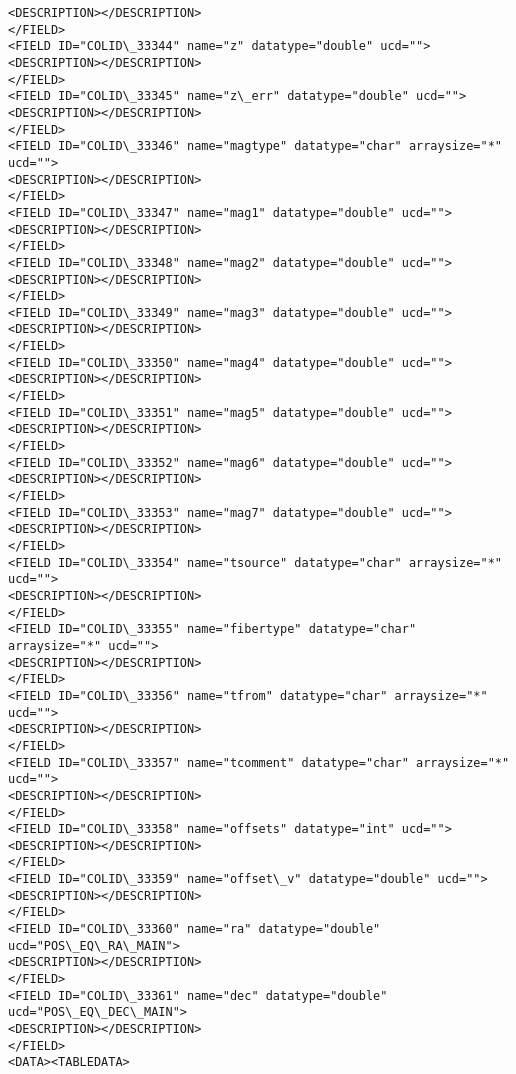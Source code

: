 \documentclass[11pt]{article}
\begin{document}
\begin{Verbatim}[commandchars=\\\{\}]
<DESCRIPTION></DESCRIPTION>
</FIELD>
<FIELD ID="COLID\_33344" name="z" datatype="double" ucd="">
<DESCRIPTION></DESCRIPTION>
</FIELD>
<FIELD ID="COLID\_33345" name="z\_err" datatype="double" ucd="">
<DESCRIPTION></DESCRIPTION>
</FIELD>
<FIELD ID="COLID\_33346" name="magtype" datatype="char" arraysize="*" ucd="">
<DESCRIPTION></DESCRIPTION>
</FIELD>
<FIELD ID="COLID\_33347" name="mag1" datatype="double" ucd="">
<DESCRIPTION></DESCRIPTION>
</FIELD>
<FIELD ID="COLID\_33348" name="mag2" datatype="double" ucd="">
<DESCRIPTION></DESCRIPTION>
</FIELD>
<FIELD ID="COLID\_33349" name="mag3" datatype="double" ucd="">
<DESCRIPTION></DESCRIPTION>
</FIELD>
<FIELD ID="COLID\_33350" name="mag4" datatype="double" ucd="">
<DESCRIPTION></DESCRIPTION>
</FIELD>
<FIELD ID="COLID\_33351" name="mag5" datatype="double" ucd="">
<DESCRIPTION></DESCRIPTION>
</FIELD>
<FIELD ID="COLID\_33352" name="mag6" datatype="double" ucd="">
<DESCRIPTION></DESCRIPTION>
</FIELD>
<FIELD ID="COLID\_33353" name="mag7" datatype="double" ucd="">
<DESCRIPTION></DESCRIPTION>
</FIELD>
<FIELD ID="COLID\_33354" name="tsource" datatype="char" arraysize="*" ucd="">
<DESCRIPTION></DESCRIPTION>
</FIELD>
<FIELD ID="COLID\_33355" name="fibertype" datatype="char" arraysize="*" ucd="">
<DESCRIPTION></DESCRIPTION>
</FIELD>
<FIELD ID="COLID\_33356" name="tfrom" datatype="char" arraysize="*" ucd="">
<DESCRIPTION></DESCRIPTION>
</FIELD>
<FIELD ID="COLID\_33357" name="tcomment" datatype="char" arraysize="*" ucd="">
<DESCRIPTION></DESCRIPTION>
</FIELD>
<FIELD ID="COLID\_33358" name="offsets" datatype="int" ucd="">
<DESCRIPTION></DESCRIPTION>
</FIELD>
<FIELD ID="COLID\_33359" name="offset\_v" datatype="double" ucd="">
<DESCRIPTION></DESCRIPTION>
</FIELD>
<FIELD ID="COLID\_33360" name="ra" datatype="double" ucd="POS\_EQ\_RA\_MAIN">
<DESCRIPTION></DESCRIPTION>
</FIELD>
<FIELD ID="COLID\_33361" name="dec" datatype="double" ucd="POS\_EQ\_DEC\_MAIN">
<DESCRIPTION></DESCRIPTION>
</FIELD>
<DATA><TABLEDATA>

\end{Verbatim}
\end{document}
